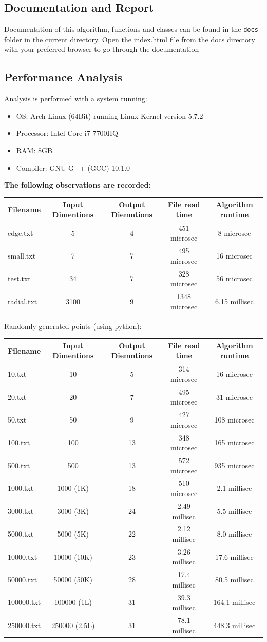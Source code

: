 \hypertarget{documentation-and-report}{%
\subsection{Documentation and Report}\label{documentation-and-report}}

Documentation of this algorithm, functions and classes can be found in
the \texttt{docs} folder in the current directory. Open the
\href{../ConvexHull/docs/html/index.html}{index.html} file from the docs
directory with your preferred browser to go through the documentation

\hypertarget{performance-analysis}{%
\subsection{Performance Analysis}\label{performance-analysis}}

Analysis is performed with a system running:

\begin{itemize}
\tightlist
\item
  OS: Arch Linux (64Bit) running Linux Kernel version 5.7.2
\item
  Processor: Intel Core i7 7700HQ
\item
  RAM: 8GB
\item
  Compiler: GNU G++ (GCC) 10.1.0
\end{itemize}

\textbf{The following observations are recorded:}

\begin{longtable}[]{@{}lcccc@{}}
\toprule
Filename & Input Dimentions & Output Diemntions & File read time &
Algorithm runtime\tabularnewline
\midrule
\endhead
edge.txt & 5 & 4 & 451 microsec & 8 microsec\tabularnewline
small.txt & 7 & 7 & 495 microsec & 16 microsec\tabularnewline
test.txt & 34 & 7 & 328 microsec & 56 microsec\tabularnewline
radial.txt & 3100 & 9 & 1348 microsec & 6.15 millisec\tabularnewline
\bottomrule
\end{longtable}

Randomly generated points (using python):

\begin{longtable}[]{@{}lcccc@{}}
\toprule
Filename & Input Dimentions & Output Diemntions & File read time &
Algorithm runtime\tabularnewline
\midrule
\endhead
10.txt & 10 & 5 & 314 microsec & 16 microsec\tabularnewline
20.txt & 20 & 7 & 495 microsec & 31 microsec\tabularnewline
50.txt & 50 & 9 & 427 microsec & 108 microsec\tabularnewline
100.txt & 100 & 13 & 348 microsec & 165 microsec\tabularnewline
500.txt & 500 & 13 & 572 microsec & 935 microsec\tabularnewline
1000.txt & 1000 (1K) & 18 & 510 microsec & 2.1 millisec\tabularnewline
3000.txt & 3000 (3K) & 24 & 2.49 millisec & 5.5 millisec\tabularnewline
5000.txt & 5000 (5K) & 22 & 2.12 millisec & 8.0 millisec\tabularnewline
10000.txt & 10000 (10K) & 23 & 3.26 millisec & 17.6
millisec\tabularnewline
50000.txt & 50000 (50K) & 28 & 17.4 millisec & 80.5
millisec\tabularnewline
100000.txt & 100000 (1L) & 31 & 39.3 millisec & 164.1
millisec\tabularnewline
250000.txt & 250000 (2.5L) & 31 & 78.1 millisec & 448.3
millisec\tabularnewline
\bottomrule
\end{longtable}

